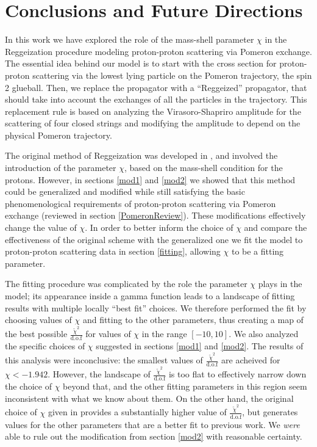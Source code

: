 \documentclass[aps, prd, preprintnumbers, floatfix, showpacs, showkeys, nofootinbib, 10pt]{revtex4-1}
\begin{document}
\section{\label{Conclusion} Conclusions and Future Directions}

In this work we have explored the role of the mass-shell parameter $\chi$ in the Reggeization procedure modeling proton-proton scattering via Pomeron exchange.  The essential idea behind our model is to start with the cross section for proton-proton scattering via the lowest lying particle on the Pomeron trajectory, the spin 2 glueball.  Then, we replace the propagator with a ``Reggeized'' propagator, that should take into account the exchanges of all the particles in the trajectory.  This replacement rule is based on analyzing the Virasoro-Shapriro amplitude for the scattering of four closed strings and modifying the amplitude to depend on the physical Pomeron trajectory.

The original method of Reggeization was developed in \cite{DHM}, and involved the introduction of the parameter $\chi$, based on the mass-shell condition for the protons.  However, in sections \ref{mod1} and \ref{mod2} we showed that this method could be generalized and modified while still satisfying the basic phenomenological requirements of proton-proton scattering via Pomeron exchange (reviewed in section \ref{PomeronReview}).  These modifications effectively change the value of $\chi$.  In order to better inform the choice of $\chi$ and compare the effectiveness of the original scheme with the generalized one we fit the model to proton-proton scattering data in section \ref{fitting}, allowing $\chi$ to be a fitting parameter.  

The fitting procedure was complicated by the role the parameter $\chi$ plays in the model; its appearance inside a gamma function leads to a landscape of fitting results with multiple locally ``best fit'' choices.  We therefore performed the fit by choosing values of $\chi$ and fitting to the other parameters, thus creating a map of the best possible $\frac{\tilde{\chi}^2}{\mathrm{d.o.f}}$ for values of $\chi$ in the range $[-10, 10]$.  We also analyzed the specific choices of $\chi$ suggested in sections \ref{mod1} and \ref{mod2}.  The results of this analysis were inconclusive: the smallest values of $\frac{\tilde{\chi}^2}{\mathrm{d.o.f}}$ are acheived for $\chi < -1.942$.  However, the landscape of $\frac{\tilde{\chi}^2}{\mathrm{d.o.f}}$ is too flat to effectively narrow down the choice of $\chi$ beyond that, and the other fitting parameters in this region seem inconsistent with what we know about them.  On the other hand, the original choice of $\chi$ given in \cite{DHM} provides a substantially higher value of $\frac{\tilde{\chi}^2}{\mathrm{d.o.f}}$, but generates values for the other parameters that are a better fit to previous work.  We \emph{were} able to rule out the modification from section \ref{mod2} with reasonable certainty.
\end{document}
